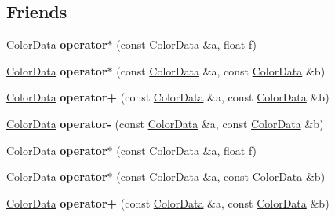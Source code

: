 \subsection*{Friends}
\begin{DoxyCompactItemize}
\item 
\hypertarget{classColorData_adf9a770243996e50282d248a4327f351}{\hyperlink{classColorData}{Color\-Data} {\bfseries operator$\ast$} (const \hyperlink{classColorData}{Color\-Data} \&a, float f)}\label{classColorData_adf9a770243996e50282d248a4327f351}

\item 
\hypertarget{classColorData_afdc3e8e6338798779739352e6bdfa42b}{\hyperlink{classColorData}{Color\-Data} {\bfseries operator$\ast$} (const \hyperlink{classColorData}{Color\-Data} \&a, const \hyperlink{classColorData}{Color\-Data} \&b)}\label{classColorData_afdc3e8e6338798779739352e6bdfa42b}

\item 
\hypertarget{classColorData_afee00faf26189979b72f3854a17200ae}{\hyperlink{classColorData}{Color\-Data} {\bfseries operator+} (const \hyperlink{classColorData}{Color\-Data} \&a, const \hyperlink{classColorData}{Color\-Data} \&b)}\label{classColorData_afee00faf26189979b72f3854a17200ae}

\item 
\hypertarget{classColorData_a799bd54f65a61569b5b968062ac0d37e}{\hyperlink{classColorData}{Color\-Data} {\bfseries operator-\/} (const \hyperlink{classColorData}{Color\-Data} \&a, const \hyperlink{classColorData}{Color\-Data} \&b)}\label{classColorData_a799bd54f65a61569b5b968062ac0d37e}

\item 
\hypertarget{classColorData_adf9a770243996e50282d248a4327f351}{\hyperlink{classColorData}{Color\-Data} {\bfseries operator$\ast$} (const \hyperlink{classColorData}{Color\-Data} \&a, float f)}\label{classColorData_adf9a770243996e50282d248a4327f351}

\item 
\hypertarget{classColorData_afdc3e8e6338798779739352e6bdfa42b}{\hyperlink{classColorData}{Color\-Data} {\bfseries operator$\ast$} (const \hyperlink{classColorData}{Color\-Data} \&a, const \hyperlink{classColorData}{Color\-Data} \&b)}\label{classColorData_afdc3e8e6338798779739352e6bdfa42b}

\item 
\hypertarget{classColorData_afee00faf26189979b72f3854a17200ae}{\hyperlink{classColorData}{Color\-Data} {\bfseries operator+} (const \hyperlink{classColorData}{Color\-Data} \&a, const \hyperlink{classColorData}{Color\-Data} \&b)}\label{classColorData_afee00faf26189979b72f3854a17200ae}


\end{DoxyCompactItemize}
